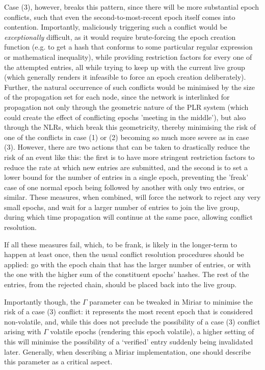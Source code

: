 \documentclass{extreport}
\begin{document}
Case (3), however, breaks this pattern, since there will be more substantial epoch conflicts, such that even the second-to-most-recent epoch itself comes into contention. Importantly, maliciously triggering such a conflict would be \emph{exceptionally} difficult, as it would require brute-forcing the epoch creation function (e.g. to get a hash that conforms to some particular regular expression or mathematical inequality), while providing restriction factors for every one of the attempted entries, all while trying to keep up with the current live group (which generally renders it infeasible to force an epoch creation deliberately). Further, the natural occurrence of such conflicts would be minimised by the size of the propagation set for each node, since the network is interlinked for propagation not only through the geometric nature of the PLR system (which could create the effect of conflicting epochs 'meeting in the middle'), but also through the NLRs, which break this geometricity, thereby minimising the risk of one of the conflicts in case (1) or (2) becoming so much more severe as in case (3). However, there are two actions that can be taken to drastically reduce the risk of an event like this: the first is to have more stringent restriction factors to reduce the rate at which new entries are submitted, and the second is to set a lower bound for the number of entries in a single epoch, preventing the 'freak' case of one normal epoch being followed by another with only two entries, or similar. These measures, when combined, will force the network to reject any very small epochs, and wait for a larger number of entries to join the live group, during which time propagation will continue at the same pace, allowing conflict resolution.

If all these measures fail, which, to be frank, is likely in the longer-term to happen at least once, then the usual conflict resolution procedures should be applied: go with the epoch chain that has the larger number of entries, or with the one with the higher sum of the constituent epochs' hashes. The rest of the entries, from the rejected chain, should be placed back into the live group.

Importantly though, the \(\Gamma\) parameter can be tweaked in Miriar to minimise the risk of a case (3) conflict: it represents the most recent epoch that is considered non-volatile, and, while this does not preclude the possibility of a case (3) conflict arising with \(\Gamma\) volatile epochs (rendering this epoch volatile), a higher setting of this will minimise the possibility of a `verified' entry suddenly being invalidated later. Generally, when describing a Miriar implementation, one should describe this parameter as a critical aspect.
\end{document}
